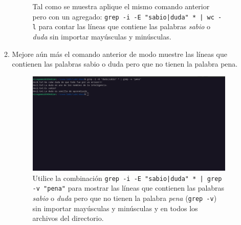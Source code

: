 \documentclass{templateNote}
\begin{document}
\begin{enumerate}
\begin{enumerate}[label=\alph*)]
\begin{figure}[H]
            Tal como se muestra aplique el mismo comando anterior pero con un agregado: \texttt{grep -i -E "sabio|duda" * | wc -l} para contar las líneas que contiene las palabras \textit{sabio} o \textit{duda} sin importar mayúsculas y minúsculas.    
        \end{figure}
        \item Mejore aún más el comando anterior de modo muestre las líneas que contienen las palabras sabio o duda pero que no tienen la palabra pena.
        \begin{figure}[H]
            \centering
            \includegraphics[width=\textwidth]{img/ejerc9d.png}
            Utilice la combinación \texttt{grep -i -E "sabio|duda" * | grep -v "pena"} para mostrar las líneas que contienen las palabras \textit{sabio} o \textit{duda} pero que no tienen la palabra \textit{pena} (\texttt{grep -v}) sin importar mayúsculas y minúsculas y en todos los archivos del directorio.
        \end{figure}
    \end{enumerate}
\end{enumerate}
\end{document}
